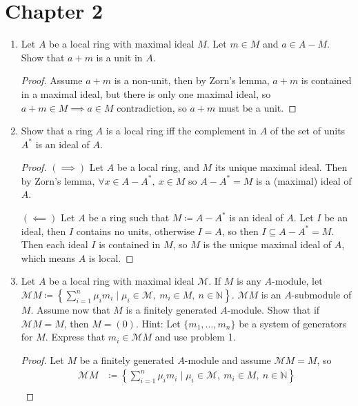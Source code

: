 \documentclass[hidelinks,12pt]{article}
\newcommand{\N}{\mathbb{N}}
\begin{document}
\section{Chapter 2}
\begin{enumerate}
    \item Let \(A\) be a local ring with maximal ideal \(M\). Let \(m\in M\) and \(a\in A-M\). Show that \(a+m\) is a unit in \(A\).
        \begin{proof}
            Assume \(a+m\) is a non-unit, then by Zorn's lemma, \(a+m\) is contained in a maximal ideal, but there is only one maximal ideal, so \(a+m\in M\implies a\in M\) contradiction, so \(a+m\) must be a unit.
        \end{proof}
    \item Show that a ring \(A\) is a local ring iff the complement in \(A\) of the set of units \(A^{*}\) is an ideal of \(A\). 
        \begin{proof}
            \((\implies)\) Let \(A\) be a local ring, and \(M\) its unique maximal ideal. Then by Zorn's lemma, \(\forall x\in A-A^{*},\ x\in M\) so \(A-A^{*}=M\) is a (maximal) ideal of \(A\).
            \par\null\par
            \((\impliedby)\) Let \(A\) be a ring such that \(M\coloneqq A-A^{*}\) is an ideal of \(A\). Let \(I\) be an ideal, then \(I\) contains no units, otherwise \(I=A\), so then  \(I\subseteq A-A^{*}=M\). Then each ideal \(I\) is contained in \(M\), so \(M\) is the unique maximal ideal of \(A\), which means \(A\) is local.
        \end{proof}
    \item Let \(A\) be a local ring with maximal ideal \(\mathcal{M}\). If \(M\) is any \(A\)-module, let \(\mathcal{M}M\coloneqq\left\{\sum_{i=1}^{n}\mu_{i}m_{i}\mid \mu_{i}\in\mathcal{M},\ m_{i}\in M,\ n\in\N\right\}\). \(\mathcal{M}M\) is an \(A\)-submodule of \(M\). Assume now that \(M\) is a finitely generated \(A\)-module. Show that if \(\mathcal{M}M=M\), then \(M=(0)\). Hint: Let \(\{m_{1},\dots,m_{n}\}\) be a system of generators for \(M\). Express that \(m_{i}\in\mathcal{M}M\) and use problem 1.
        \begin{proof}
            Let \(M\) be a finitely generated \(A\)-module and assume \(\mathcal{M}M=M\), so \begin{align*}
                \mathcal{M}M&\coloneqq\left\{\sum_{i=1}^{n}\mu_{i}m_{i}\mid \mu_{i}\in\mathcal{M},\ m_{i}\in M,\ n\in\N\right\}\\ 

\end{align*}
\end{proof}
\end{enumerate}
\end{document}
